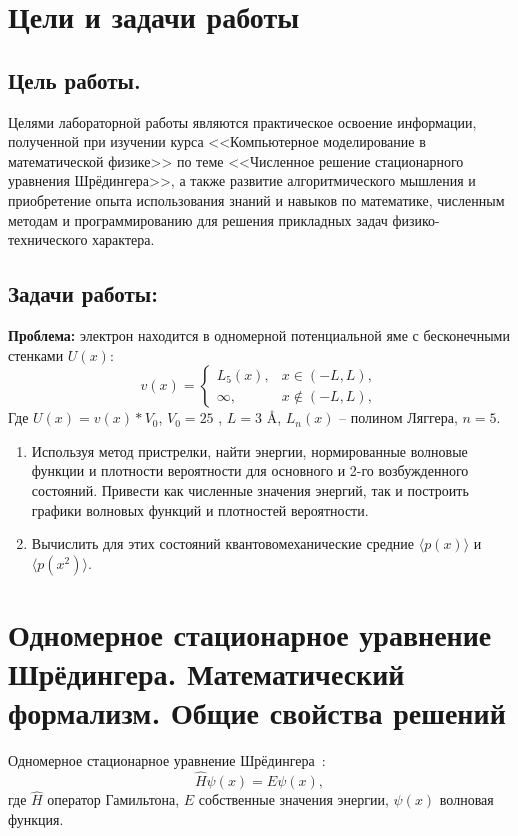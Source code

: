 \documentclass[a4paper,12pt]{article}
\begin{document}
\newpage
\tableofcontents
\pagestyle{plain}
\setcounter{page}{2}

\newpage
\section{Цели и задачи работы}\label{sec:goals}
\subsection{Цель работы.}\label{subsec:-.}
Целями лабораторной работы являются практическое освоение информации, полученной при изучении курса <<Компьютерное моделирование в математической физике>> по теме <<Численное решение стационарного уравнения Шрёдингера>>, а также развитие алгоритмического мышления и приобретение опыта использования знаний и навыков по математике, численным методам и программированию для решения прикладных задач физико-технического характера.

\subsection{Задачи работы:}\label{subsec:-:}

\textbf{Проблема:} электрон находится в одномерной потенциальной яме с бесконечными стенками $U(x)$:
\[
v(x) =
    \begin{cases}
        L_5(x), & x \in (-L, L), \\
        \infty, & x \notin (-L, L),
    \end{cases}
\]
Где $U(x) = v(x)*V_0$, $V_0 = 25$ , $L = 3$ \AA, $L_n(x)$ -- полином Ляггера, $n = 5$.

\begin{enumerate}
    \item Используя метод пристрелки, найти энергии, нормированные волновые функции и плотности вероятности для основного и 2-го возбужденного состояний.
          Привести как численные значения энергий, так и построить графики волновых функций и плотностей вероятности.
    \item Вычислить для этих состояний квантовомеханические средние $\langle p(x) \rangle$ и $ \langle p(x^2) \rangle $.
\end{enumerate}

\newpage
\section{Одномерное стационарное уравнение Шрёдингера. Математический формализм. Общие свойства решений}\label{sec:-}
Одномерное стационарное уравнение Шрёдингера~\cite{tim}:
\begin{equation}
    \hat{H}\psi(x) = E\psi(x),
    \label{eq:oneDimShrodingerEq}
\end{equation}
где $\hat{H}$ \textendash{} оператор Гамильтона, $E$ \textendash{} собственные значения энергии, $\psi(x)$ \textendash{} волновая функция.
\end{document}
